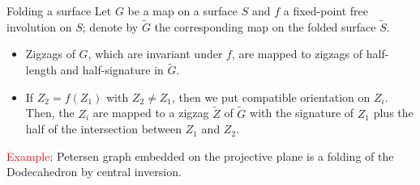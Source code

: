 \documentclass[%
pdf,
colorBG,
slideColor,
]{prosper}
\begin{document}
\begin{slide}{Folding a surface}
Let $G$ be a map on a surface $S$ and $f$ a fixed-point free involution on $S$;
denote by $\tilde{G}$ the corresponding map on the folded surface $\tilde{S}$.

\begin{itemize}
\item Zigzags of $G$, which are invariant under $f$, are mapped to zigzags of half-length and half-signature in $\tilde{G}$.

\item If $Z_2=f(Z_1)$ with $Z_2\not= Z_1$, then we put compatible orientation on $Z_i$. Then, the $Z_i$ are mapped to a zigzag $\tilde{Z}$ of $\tilde{G}$ with the signature of $Z_1$ plus the half of the intersection between $Z_1$ and $Z_2$.

\end{itemize}

\textcolor{red}{Example}: Petersen graph embedded on the projective plane is a folding of the Dodecahedron by central inversion.


\end{slide}
\end{document}

